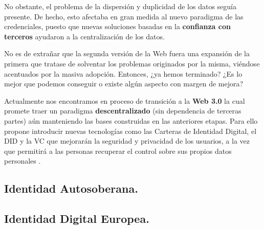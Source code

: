 \documentclass[../main.tex]{subfiles}
\begin{document}
No obstante, el problema de la dispersión y duplicidad de los datos seguía presente. De hecho, esto afectaba en gran medida al nuevo paradigma de las credenciales, puesto que nuevas soluciones basadas en la \textbf{confianza con terceros} ayudaron a la centralización de los datos.
\\

\begin{tcolorbox}[colback=gray!10!white, colframe=gray!50!black, title=Reflexión]\label{reflexion}
No es de extrañar que la segunda versión de la Web fuera una expansión de la primera que tratase de solventar los problemas originados por la misma, viéndose acentuados por la masiva adopción. Entonces, ¿ya hemos terminado? ¿Es lo mejor que podemos conseguir o existe algún aspecto con margen de mejora?
\end{tcolorbox}

\vspace{1cm} 

Actualmente nos encontramos en proceso de transición a la \textbf{Web 3.0} la cual promete traer un paradigma \textbf{descentralizado} (sin dependencia de terceras partes) aún manteniendo las bases construidas en las anteriores etapas. Para ello propone introducir nuevas tecnologías como las Carteras de Identidad Digital, el \acrfull{DID} y la \acrfull{VC} que mejorarán la seguridad y privacidad de los usuarios, a la vez que permitirá a las personas recuperar el control sobre sus propios datos personales \cite{WebAuthentication}.

\newpage
\subsection{Identidad Autosoberana.}\label{Identidad Autosoberana}


\newpage
\subsection{Identidad Digital Europea.}\label{Identidad Digital Europea}

\end{document}
